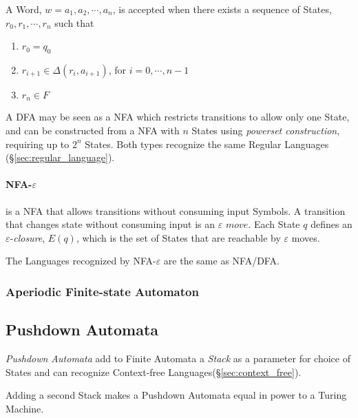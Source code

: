 A Word, $w=a_1,a_2,\cdots,a_n$, is accepted when there exists a
sequence of States, $r_0,r_1,\cdots,r_n$ such that
\begin{enumerate}
\item $r_0 = q_0$
\item $r_{i+1} \in \Delta(r_i, a_{i+1})$, for $i = 0, \cdots, n-1$
\item $r_n \in F$
\end{enumerate}

A DFA may be seen as a NFA which restricts transitions to allow only
one State, and can be constructed from a NFA with $n$ States using
\emph{powerset construction}, requiring up to $2^n$ States. Both types
recognize the same Regular Languages
(\S\ref{sec:regular_language}).

\paragraph{NFA-$\varepsilon$} is a NFA that allows transitions
without consuming input Symbols. A transition that changes state
without consuming input is an $\varepsilon$ $move$. Each State $q$
defines an $\varepsilon$-\emph{closure}, $E(q)$, which is the set of
States that are reachable by $\varepsilon$ moves.

The Languages recognized by NFA-$\varepsilon$ are the same as NFA/DFA.



\subsubsection{Aperiodic Finite-state Automaton}
\label{sec:aperiodic_automaton}



\subsection{Pushdown Automata}\label{sec:pushdown_automata}

\emph{Pushdown Automata} add to Finite Automata a \emph{Stack} as a
parameter for choice of States and can recognize Context-free
Languages(\S\ref{sec:context_free}).

Adding a second Stack makes a Pushdown Automata equal in power to a
Turing Machine.

